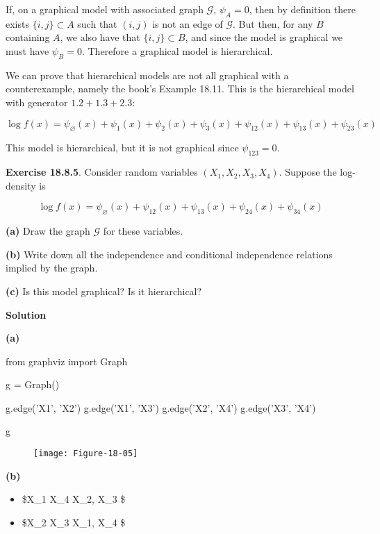 If, on a graphical model with associated graph \(\mathcal{G}\),
\(\psi_A = 0\), then by definition there exists \(\{ i, j \} \subset A\)
such that \((i, j)\) is not an edge of \(\mathcal{G}\). But then, for
any \(B\) containing \(A\), we also have that \(\{ i, j \} \subset B\),
and since the model is graphical we must have \(\psi_B = 0\). Therefore
a graphical model is hierarchical.

We can prove that hierarchical models are not all graphical with a
counterexample, namely the book's Example 18.11. This is the
hierarchical model with generator \(1.2 + 1.3 + 2.3\):

\[\log f(x) = \psi_\varnothing(x) + \psi_1(x) + \psi_2(x) + \psi_3(x) + \psi_{12}(x) + \psi_{13}(x) + \psi_{23}(x)\]

This model is hierarchical, but it is not graphical since
\(\psi_{123} = 0\).

\textbf{Exercise 18.8.5}. Consider random variables
\((X_1, X_2, X_3, X_4)\). Suppose the log-density is

\[\log f(x) = \psi_\varnothing(x) + \psi_{12}(x) + \psi_{13}(x) + \psi_{24}(x) + \psi_{34}(x) \]

\textbf{(a)} Draw the graph \(\mathcal{G}\) for these variables.

\textbf{(b)} Write down all the independence and conditional
independence relations implied by the graph.

\textbf{(c)} Is this model graphical? Is it hierarchical?

\textbf{Solution}

\textbf{(a)}

\begin{python}
from graphviz import Graph

g = Graph()

g.edge('X1', 'X2')
g.edge('X1', 'X3')
g.edge('X2', 'X4')
g.edge('X3', 'X4')

g
\end{python}

\begin{figure}[H]
\texttt{[image: Figure-18-05]}
\end{figure}

\textbf{(b)}

\begin{itemize}[tightlist]
\item
  \$X\_1  X\_4 \textbar{} X\_2, X\_3 \$
\item
  \$X\_2  X\_3 \textbar{} X\_1, X\_4 \$
\end{itemize}

